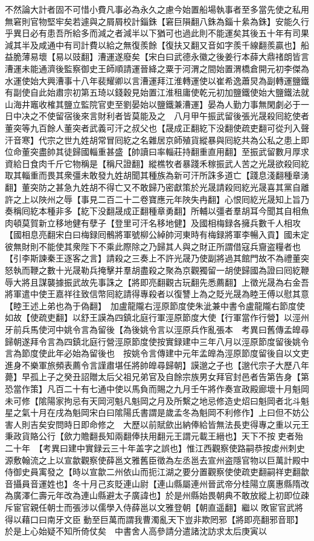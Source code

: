 不然論大計者固不可惜小費凡事必為永久之慮今始置船場執事者至多當先使之私用無窘則官物堅牢矣若遽與之屑屑校計錙銖【窘巨隕翻八銖為錙十絫為銖】安能久行乎異日必有患吾所給多而減之者減半以下猶可也過此則不能運矣其後五十年有司果減其半及咸通中有司計費以給之無復羨餘【復扶又翻又音如字羨千線翻羨贏也】船益脆薄易壞【易以豉翻】漕運遂廢矣【宋白曰武德永徽之後姜行本薛大鼎禇朗皆言漕運未能通濟後監察御史王師順請運晉絳之粟于河渭之間始置渭橋倉開元初李傑為水運使始大興漕事十八年裴耀卿以言漕運拜江淮轉運使以崔希逸蕭炅為副轉運鹽鐵有副使自此始肅宗初第五琦以錢穀見始置江淮租庸使乾元初加鹽鐵使始大鹽鐵法就山海井竈收榷其鹽立監院官吏至劉晏始以鹽鐵兼漕運】晏為人勤力事無閑劇必于一日中决之不使留宿後來言財利者皆莫能及之　八月甲午振武留後張光晟殺囘紇使者董突等九百餘人董突者武義可汗之叔父也【晟成正翻紇下没翻使疏吏翻可從刋入聲汗音寒】代宗之世九姓胡常冒囘紇之名雜居京師殖貨縱暴與囘紇共為公私之患上即位命董突盡帥其徒歸國輜重甚盛【帥讀曰率輜莊持翻重直用翻】至振武留數月厚求資給日食肉千斤它物稱是【稱尺證翻】縱樵牧者暴踐禾稼振武人苦之光晟欲殺囘紇取其輜重而畏其衆彊未敢發九姓胡聞其種族為新可汗所誅多道亡【踐息淺翻種章湧翻】董突防之甚急九姓胡不得亡又不敢歸乃密獻策於光晟請殺囘紇光晟喜其黨自離許之上以陜州之辱【事見二百二十二卷寶應元年陜失冉翻】心恨囘紇光晟知上旨乃奏稱囘紇本種非多【紇下没翻晟成正翻種章勇翻】所輔以彊者羣胡耳今聞其自相魚肉頓莫賀新立移地健有孽子【登里可汗名移地健】及國相梅録各擁兵數千人相攻【國相息亮翻宋白曰梅録囘鶻將軍號柳公綽帥河東時有梅録將軍李暢入貢】國未定彼無財則不能使其衆陛下不乘此際除之乃歸其人與之財正所謂借寇兵齎盗糧者也【引李斯諫秦王逐客之言】請殺之三奏上不許光晟乃使副將過其館門故不為禮董突怒執而鞭之數十光晟勒兵掩擊并羣胡盡殺之聚為京觀獨留一胡使歸國為證曰囘紇鞭辱大將且謀襲據振武故先事誅之【將即亮翻觀古玩翻先悉薦翻】上徵光晟為右金吾將軍遣中使王嘉祥往致信幣囘紇請得專殺者以復讐上為之貶光晟為睦王傅以慰其意【睦王述上弟也為于偽翻】　加盧龍隴右涇原節度使朱泚兼中書令盧龍隴右節度使如故【使疏吏翻】以舒王謨為四鎮北庭行軍涇原節度大使【行軍當作行營】以涇州牙前兵馬使河中姚令言為留後【為後姚令言以涇原兵作亂張本　考異曰舊傳孟皥尋歸朝遂拜令言為四鎮北庭行營涇原節度使按實録建中三年八月以涇原節度留後姚令言為節度使此年必始為留後也　按姚令言傳建中元年孟皥為涇原節度留後自以文吏進身不樂軍旅頻表薦令言謹肅堪任將帥皥尋歸朝】謨邈之子也【邈代宗子大歷八年薨】早孤上子之癸丑詔贈太后父祖兄弟官及自餘宗族男女拜官封邑者告第告身【第恐當作策】凡百二十有七通中使以馬負而賜之九月壬午將作奏宣政殿廊壞十月魁岡未可修【隂陽家拘忌有天岡河魁凡魁岡之月及所繫之地忌修造史炤曰魁岡者北斗魁星之氣十月在戌為魁岡宋白曰隂陽氏書謂是歲孟冬為魁岡不利修作】上曰但不妨公害人則吉矣安問時日即命修之　大歷以前賦歛出納俸給皆無法長吏得專之重以元王秉政貨賂公行【歛力贍翻長知兩翻俸扶用翻元王謂元載王縉也】天下不按吏者殆二十年　【考異曰建中實録云三十年盖字之誤也】惟江西觀察使路嗣恭按䖍州刺史源敷翰流之上以宣歙觀察使薛邕文雅舊臣徵為左丞邕去宣州盗隱官物以巨萬計殿中侍御史員㝢發之【時以宣歙二州依山而扼江湖之要分置觀察使使疏吏翻嗣祥吏翻歙音攝員音運姓也】冬十月己亥貶連山尉【連山縣屬連州晉武帝分桂陽立廣惠縣隋改為廣澤仁壽元年改為連山縣避太子廣諱也】於是州縣始畏朝典不敢放縱上初即位疎斥宦官親任朝士而張涉以儒學入侍薛邕以文雅登朝【朝直遥翻】繼以敗宦官武將得以藉口曰南牙文臣動至巨萬而謂我曹濁亂天下豈非欺罔邪【將即亮翻邪音耶】於是上心始疑不知所倚仗矣　中書舍人高參請分遣諸沈訪求太后庚寅以